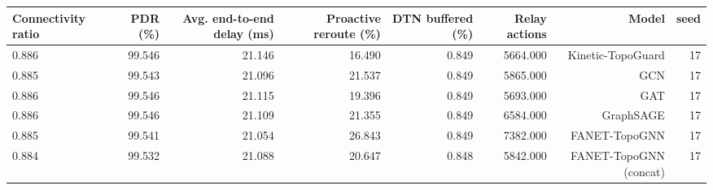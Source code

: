 \begin{tabular}{lrrrrrrr}
\toprule
Connectivity ratio & PDR (\%) & Avg. end-to-end delay (ms) & Proactive reroute (\%) & DTN buffered (\%) & Relay actions & Model & seed \\
\midrule
0.886 & 99.546 & 21.146 & 16.490 & 0.849 & 5664.000 & Kinetic-TopoGuard & 17 \\
0.885 & 99.543 & 21.096 & 21.537 & 0.849 & 5865.000 & GCN & 17 \\
0.886 & 99.546 & 21.115 & 19.396 & 0.849 & 5693.000 & GAT & 17 \\
0.886 & 99.546 & 21.109 & 21.355 & 0.849 & 6584.000 & GraphSAGE & 17 \\
0.885 & 99.541 & 21.054 & 26.843 & 0.849 & 7382.000 & FANET-TopoGNN & 17 \\
0.884 & 99.532 & 21.088 & 20.647 & 0.848 & 5842.000 & FANET-TopoGNN (concat) & 17 \\
\bottomrule
\end{tabular}
